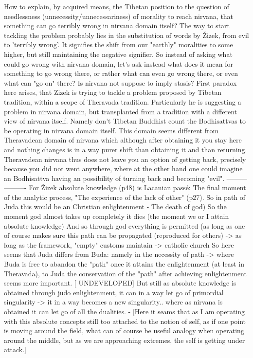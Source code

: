\documentclass[10pt]{book}
\begin{document}
How to explain, by acquired means, the Tibetan position to the question of needlessness (unnecessity/unnecessariness) of morality to reach nirvana, that something can go terribly wrong in nirvana domain itself?
The way to start tackling the problem probably lies in the substitution of words by \v Zizek, from evil to 'terribly wrong'. It signifies the shift from our "earthly" moralities to some higher, but still maintaining the negative signifier. So instead of asking what could go wrong with nirvana domain, let's ask instead what does it mean for something to go wrong there, or rather what can even go wrong there, or even what can "go on" there? Is nirvana not suppose to imply stasis?
First paradox here arises, that Zizek is trying to tackle a problem proposed by Tibetan tradition, within a scope of Theravada tradition. Particularly he is suggesting a problem in nirvana domain, but transplanted from a tradition with a different view of nirvana itself. Namely don't Tibetan Buddhist count the Bodhisattvas to be operating in nirvana domain itself. This domain seems different from Theravadean domain of nirvana which although after obtaining it you stay here and nothing changes is in a way purer shift than obtaining it and than returning. Theravadean nirvana thus does not leave you an option of getting back, precisely because you did not went anywhere, where at the other hand one could imagine an Bodhisattva having an possibility of turning back and becoming "evil".
---------
----------
For \v Zizek absolute knowledge (p48) is Lacanian pass\'e: 
The final moment of the analytic process, "The experience of the lack of other" (p27). So in path of Juda this would be an Christian enlightenment - The death of god) So the moment god almost takes up completely it dies (the moment we or I attain absolute knowledge) And so through god everything is permitted (as long as one of course makes sure this path can be propagated (reproduced for others) -> as long as the framework, "empty" customs maintain -> catholic church 
So here seems that Juda differs from Buda: namely in the necessity of path -> where Buda is free to abandon the "path" once it attains the enlightenment (at least in Theravada), to Juda the conservation of the "path" after achieving enlightenment seems more important. [ UNDEVELOPED] But still as absolute knowledge is obtained through judo enlightenment, it can in a way let go of primordial singularity -> it in a way becomes a new singularity.. where as nirvana is obtained it can let go of all the dualities. - [Here it seams that as I am operating with this absolute concepts still too attached to the notion of self, as if one point is moving around the field, what can of course be useful analogy when operating around the middle, but as we are approaching extremes, the self is getting under attack.]
\end{document}
